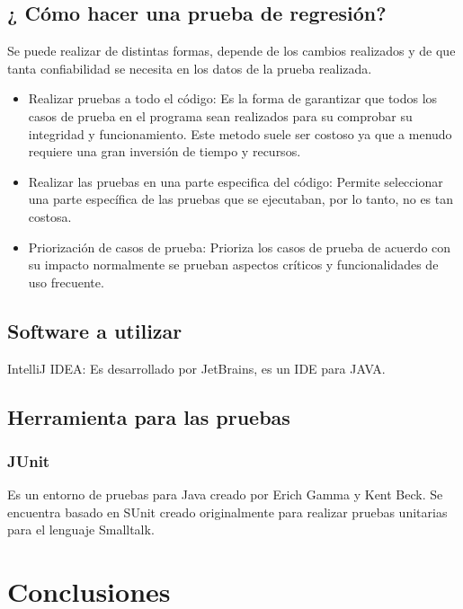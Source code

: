 \documentclass[conference]{IEEEtran}
\begin{document}
\subsection{¿ Cómo hacer una prueba de regresión?}

Se puede realizar de distintas formas, depende de los cambios realizados y de que tanta confiabilidad se necesita en los datos de la prueba realizada.

\begin{itemize}

\item Realizar pruebas a todo el código: Es la forma de garantizar que todos los casos de prueba en el programa sean realizados para su comprobar su integridad y funcionamiento. Este metodo suele ser costoso ya que a menudo requiere una gran inversión de tiempo y recursos.


\item Realizar las pruebas en una parte especifica del código:   
Permite seleccionar una parte específica de las pruebas que se ejecutaban, por lo tanto, no es tan costosa.

\item Priorización de casos de prueba: Prioriza los casos de prueba de acuerdo con su impacto normalmente se prueban aspectos críticos y funcionalidades de uso frecuente.

\end{itemize}


\subsection{Software a utilizar}

IntelliJ IDEA: Es desarrollado por JetBrains, es un IDE para JAVA.

\subsection{Herramienta para las pruebas}
	
\subsubsection{JUnit}

Es un entorno de pruebas para Java creado por Erich Gamma y Kent Beck. Se encuentra basado en SUnit creado originalmente para realizar pruebas unitarias para el lenguaje Smalltalk.

\section{Conclusiones}
\end{document}
